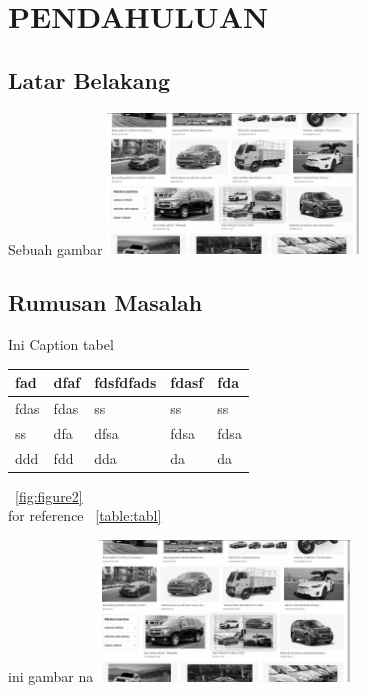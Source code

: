 
\chapter{PENDAHULUAN}

\section{Latar Belakang}
\blindtext

\begin{afigure}{Sebuah gambar}
    \label{fig:figure2}
    \includegraphics[width=0.5\textwidth, center]{images/input.png}
\end{afigure}

\blindtext

\section{Rumusan Masalah}
\blindtext

\begin{atable}{Ini Caption tabel}
    \label{table:tabl}
    \begin{tabular}{|l|l|l|l|l|}
    \hline
    fad  & dfaf & fdsfdfads & fdasf & fda  \\
    \hline
    fdas & fdas & ss        & ss    & ss   \\
    \hline
    ss   & dfa  & dfsa      & fdsa  & fdsa \\
    \hline
    ddd  & fdd  & dda       & da    & da \\
    \hline
    \end{tabular}
\end{atable}

\blindtext
~\ref{fig:figure2}
\\
for reference ~\ref{table:tabl}

\begin{afigure}{ini gambar na}
    \label{fig:f1}
    \includegraphics[width=0.5\textwidth, center]{images/input.png}
\end{afigure}
